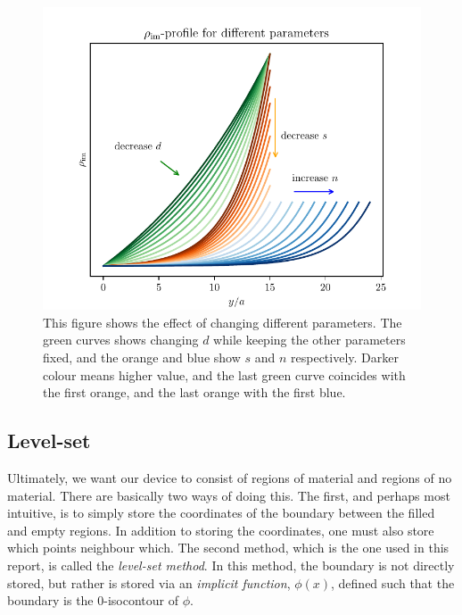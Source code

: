 \begin{figure}[htpb]
	\centering
	\includegraphics{chapters/methods/pml_profile.pdf}
	\caption{
		This figure shows the effect of changing different parameters.
		The green curves shows changing $d$ while keeping the other parameters
		fixed, and the orange and blue show $s$ and $n$ respectively.
		Darker colour means higher value, and the last green curve coincides
		with the first orange, and the last orange with the first blue.
	}
	\label{fig:pml_profile}
\end{figure}



\subsection{Level-set}\label{sec:level-set}

Ultimately, we want our device to consist of regions of material and regions of
no material.
There are basically two ways of doing this.
The first, and perhaps most intuitive,
is to simply store the coordinates of the boundary between the filled and empty
regions.
In addition to storing the coordinates, one must also store which points
neighbour which.
The second method, which is the one used in this report, is called
the \emph{level-set method}.
In this method, the boundary is not directly stored, but rather is stored via an
\emph{implicit function}, $\phi(x)$, defined such that the boundary is the
0-isocontour of $\phi$.

